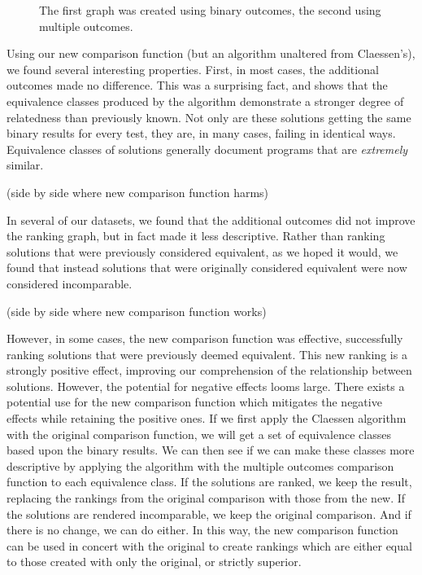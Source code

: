 \documentclass[11pt,twoside]{article}
\begin{document}
\begin{figure}
\caption{The first graph was created using binary outcomes, the second using multiple outcomes.}
\end{figure}

Using our new comparison function (but an algorithm unaltered from Claessen's), we found several interesting properties. First, in most cases, the additional outcomes made no difference. This was a surprising fact, and shows that the equivalence classes produced by the algorithm demonstrate a stronger degree of relatedness than previously known. Not only are these solutions getting the same binary results for every test, they are, in many cases, failing in  identical ways. Equivalence classes of solutions generally document programs that are \emph{extremely} similar.

(side by side where new comparison function harms)

In several of our datasets, we found that the additional outcomes did not improve the ranking graph, but in fact made it less descriptive. Rather than ranking solutions that were previously considered equivalent, as we hoped it would, we found that instead solutions that were originally considered equivalent were now considered incomparable.

(side by side where new comparison function works)

However, in some cases, the new comparison function was effective, successfully ranking solutions that were previously deemed equivalent. This new ranking is a strongly positive effect, improving our comprehension of the relationship between solutions. However, the potential for negative effects looms large. There exists a potential use for the new comparison function which mitigates the negative effects while retaining the positive ones. If we first apply the Claessen algorithm with the original comparison function, we will get a set of equivalence classes based upon the binary results. We can then see if we can make these classes more descriptive by applying the algorithm with the multiple outcomes comparison function to each equivalence class. If the solutions are ranked, we keep the result, replacing the rankings from the original comparison with those from the new. If the solutions are rendered incomparable, we keep the original comparison. And if there is no change, we can do either. In this way, the new comparison function can be used in concert with the original to create rankings which are either equal to those created with only the original, or strictly superior.
\end{document}
